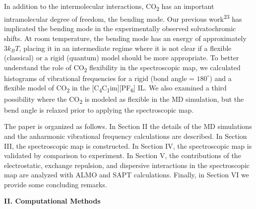 \documentclass[]{article}
\begin{document}
In addition to the intermolecular interactions, CO\textsubscript{2} has
an important intramolecular degree of freedom, the bending mode. Our
previous work\textsuperscript{23} has implicated the bending mode in the
experimentally observed solvatochromic shifts. At room temperature, the
bending mode has an energy of approximately \(3k_{B}T\), placing it in
an intermediate regime where it is not clear if a flexible (classical)
or a rigid (quantum) model should be more appropriate. To better
understand the role of CO\textsubscript{2} flexibility in the
spectroscopic map, we calculated histograms of vibrational frequencies
for a rigid (bond angle = \(180^{\circ}\)) and a flexible model of
CO\textsubscript{2} in the
{[}C\textsubscript{4}C\textsubscript{1}im{]}{[}PF\textsubscript{6}{]}
IL. We also examined a third possibility where the CO\textsubscript{2}
is modeled as flexible in the MD simulation, but the bend angle is
relaxed prior to applying the spectroscopic map.

The paper is organized as follows. In Section II the details of the MD
simulations and the anharmonic vibrational frequency calculations are
described. In Section III, the spectroscopic map is constructed. In
Section IV, the spectroscopic map is validated by comparison to
experiment. In Section V, the contributions of the electrostatic,
exchange repulsion, and dispersive interactions in the spectroscopic map
are analyzed with ALMO and SAPT calculations. Finally, in Section VI we
provide some concluding remarks.

\textbf{II. Computational Methods}
\end{document}
